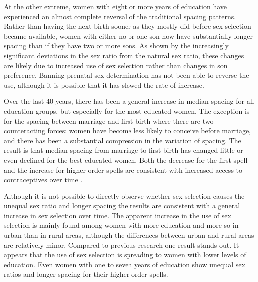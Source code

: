 \documentclass[12pt,letterpaper]{article}
\begin{document}
At the other extreme, women with eight or more years of education have
experienced an almost complete reversal of the traditional spacing patterns.
Rather than having the next birth sooner as they mostly did before 
sex selection became available, women with either no or one son now 
have substantially longer spacing than if they have two or more sons.
As shown by the increasingly significant deviations in the sex ratio
from the natural sex ratio, these changes are likely due to increased
use of sex selection rather than changes in son preference. 
Banning prenatal sex determination has not been able to
reverse the use, although it is possible that it has slowed the rate 
of increase.

Over the last 40 years, there has been a general increase in median
spacing for all education groups, but especially for the most 
educated women.
The exception is for the spacing between marriage and first birth
where there are two counteracting forces: women have become less likely 
to conceive before marriage, and there has been a substantial compression 
in the variation of spacing.
The result is that median spacing from marriage to first birth
has changed little or even declined for the best-educated women.
Both the decrease for the first spell and the increase for higher-order
spells are consistent with increased access to contraceptives over
time \citep{Yeakey2009}.



Although it is not possible to directly observe whether sex selection
causes the unequal sex ratio and longer spacing the results are
consistent with a general increase in sex selection over time. 
The apparent increase in the use of sex selection is mainly found among
women with more education and more so in urban than in rural areas,
although the differences between urban and rural areas are relatively
minor. 
Compared to previous research one result stands out. 
It appears that the use of sex selection is spreading to women with lower 
levels of education.
Even women with one to seven years of education show unequal sex ratios 
and longer spacing for their higher-order spells.
\end{document}
